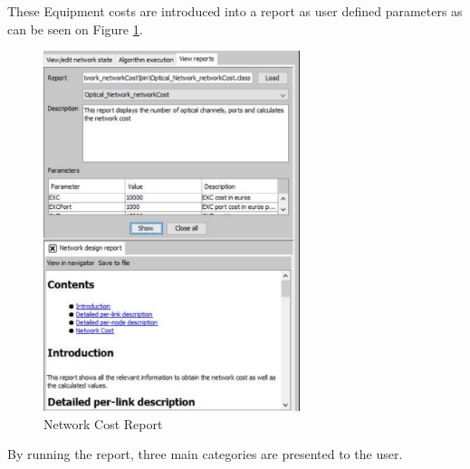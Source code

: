 	These Equipment costs are introduced into a report as user defined parameters as can be seen on Figure \ref{networkCost_Report}.
	
	\begin{figure}[h!]
		\centering
		\includegraphics[width=7.5cm]{networkCost_Report.pdf}
		\caption{Network Cost Report}
		\label{networkCost_Report}
	\end{figure}	
	
	

	
	
	By running the report, three main categories are presented to the user.
	
